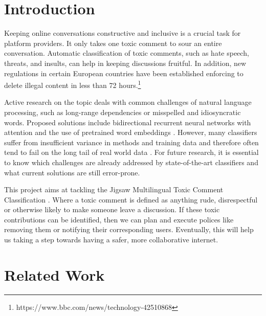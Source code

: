 \documentclass[10pt,twocolumn,letterpaper]{article}
\begin{document}
\section{Introduction}

Keeping online conversations constructive and inclusive is a crucial task for platform providers. It only takes one toxic comment to sour an entire conversation. Automatic classification of toxic comments, such as hate speech, threats, and insults, can help in keeping discussions fruitful. In addition, new regulations in certain European countries have been established enforcing to delete illegal content in less than 72 hours.\footnote {https://www.bbc.com/news/technology-42510868}

Active research on the topic deals with common challenges of natural language processing,
such as long-range dependencies or misspelled
 and idiosyncratic words. Proposed solutions include bidirectional recurrent neural networks with attention \cite{r01} and the use of pretrained word embeddings \cite{r02}. However, many classifiers suffer from insufficient variance in methods and training data and therefore often tend to fail on the long tail of real world data \cite{r03}. For future research, it is essential to know which challenges are already addressed by state-of-the-art classifiers and what current solutions are still error-prone.

This project aims at tackling the Jigsaw Multilingual Toxic Comment Classification \cite{Jigsaw}. Where a toxic comment is defined as anything rude, disrespectful or otherwise likely to make someone leave a discussion. If these toxic contributions can be identified, then we can plan and execute polices like removing them or notifying their corresponding users. Eventually, this will help us taking a step towards having a safer, more collaborative internet. 

\section{Related Work}
\end{document}
